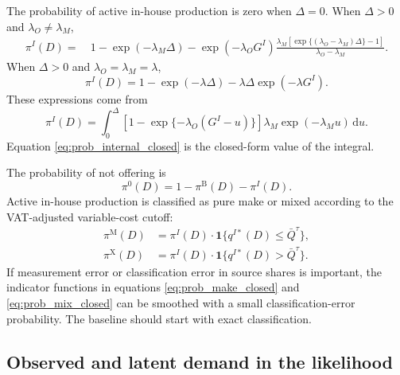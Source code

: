 \documentclass[11pt,a4paper]{article}
\newcommand{\one}{\mathbf{1}}
\newcommand{\M}{\mathrm{M}}
\newcommand{\B}{\mathrm{B}}
\newcommand{\X}{\mathrm{X}}
\newcommand{\dd}{\mathrm{d}}
\begin{document}
The probability of active in-house production is zero when $\Delta=0$. When $\Delta>0$ and $\lambda_O\neq\lambda_M$,
\begin{align}
    \pi^{I}(D)
    =&\ 1-\exp(-\lambda_M\Delta)
    -\exp(-\lambda_O G^I)
      \frac{\lambda_M\left[\exp\{(\lambda_O-\lambda_M)\Delta\}-1\right]}
           {\lambda_O-\lambda_M}.
    \label{eq:prob_internal_closed}
\end{align}
When $\Delta>0$ and $\lambda_O=\lambda_M=\lambda$,
\begin{equation}
    \pi^{I}(D)
    =1-\exp(-\lambda\Delta)-\lambda\Delta\exp(-\lambda G^I).
    \label{eq:prob_internal_equal_rates}
\end{equation}
These expressions come from
\begin{equation}
    \pi^I(D)=\int_0^{\Delta}\left[1-\exp\{-\lambda_O(G^I-u)\}\right]\lambda_M\exp(-\lambda_M u)\,\dd u.
    \label{eq:prob_internal_integral}
\end{equation}
Equation \eqref{eq:prob_internal_closed} is the closed-form value of the integral.

The probability of not offering is
\begin{equation}
    \pi^0(D)=1-\pi^{\B}(D)-\pi^{I}(D).
    \label{eq:prob_no_offer_closed}
\end{equation}
Active in-house production is classified as pure make or mixed according to the VAT-adjusted variable-cost cutoff:
\begin{align}
    \pi^{\M}(D)&=\pi^I(D)\cdot \one\{q^{I*}(D)\leq\bar Q^{\tau}\},
    \label{eq:prob_make_closed}\\
    \pi^{\X}(D)&=\pi^I(D)\cdot \one\{q^{I*}(D)>\bar Q^{\tau}\}.
    \label{eq:prob_mix_closed}
\end{align}
If measurement error or classification error in source shares is important, the indicator functions in equations \eqref{eq:prob_make_closed} and \eqref{eq:prob_mix_closed} can be smoothed with a small classification-error probability. The baseline should start with exact classification.

\subsection{Observed and latent demand in the likelihood}
\end{document}
